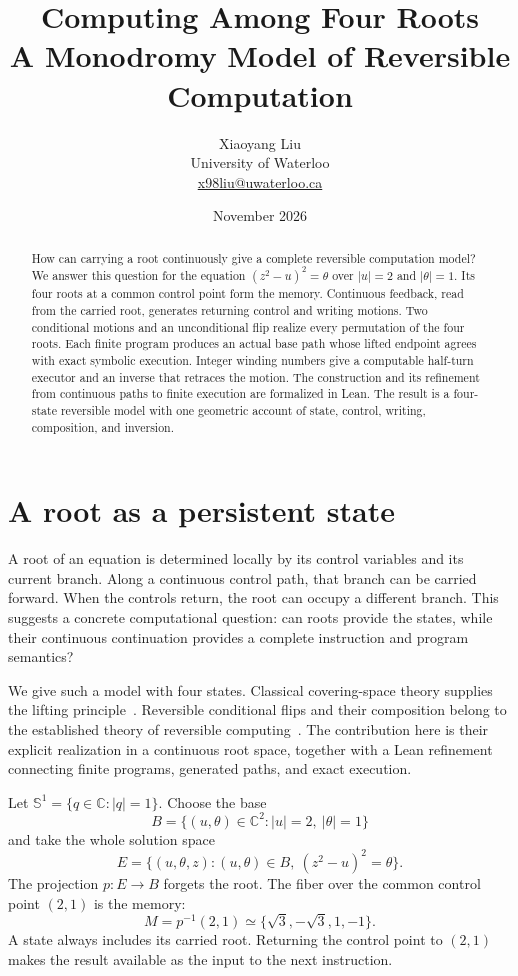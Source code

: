 \documentclass[11pt]{article}
\title{Computing Among Four Roots\\[0.3em]
  \large A Monodromy Model of Reversible Computation}
\author{Xiaoyang Liu\\[0.2em]
  \small University of Waterloo\\
  \small\href{mailto:x98liu@uwaterloo.ca}{x98liu@uwaterloo.ca}}
\date{\small November 2026}
\newcommand{\Sone}{\mathbb S^1}
\begin{document}
\maketitle
\begin{abstract}
How can carrying a root continuously give a complete reversible computation
model? We answer this question for the equation $(z^2-u)^2=\theta$ over
$|u|=2$ and $|\theta|=1$. Its four roots at a common control point form the
memory. Continuous feedback, read from the carried root, generates returning
control and writing motions. Two conditional motions and an unconditional
flip realize every permutation of the four roots. Each finite program
produces an actual base path whose lifted endpoint agrees with exact symbolic
execution. Integer winding numbers give a computable half-turn executor and
an inverse that retraces the motion. The construction and its refinement
from continuous paths to finite execution are formalized in Lean. The result
is a four-state reversible model with one geometric account of state,
control, writing, composition, and inversion.
\end{abstract}

\section{A root as a persistent state}

A root of an equation is determined locally by its control variables and its
current branch. Along a continuous control path, that branch can be carried
forward. When the controls return, the root can occupy a different branch.
This suggests a concrete computational question: can roots provide the
states, while their continuous continuation provides a complete instruction
and program semantics?

We give such a model with four states. Classical covering-space theory
supplies the lifting principle~\cite{hatcher}. Reversible conditional flips
and their composition belong to the established theory of reversible
computing~\cite{toffoli}. The contribution here is their explicit realization
in a continuous root space, together with a Lean refinement connecting
finite programs, generated paths, and exact execution.

Let $\Sone=\{q\in\mathbb C:|q|=1\}$. Choose the base
\[
 B=\{(u,\theta)\in\mathbb C^2:|u|=2,\ |\theta|=1\}
\]
and take the whole solution space
\begin{equation}\label{eq:space}
 E=\{(u,\theta,z):(u,\theta)\in B,\ (z^2-u)^2=\theta\}.
\end{equation}
The projection $p:E\to B$ forgets the root. The fiber over the common control
point $(2,1)$ is the memory:
\[
 M=p^{-1}(2,1)\simeq\{\sqrt3,-\sqrt3,1,-1\}.
\]
A state always includes its carried root. Returning the control point to
$(2,1)$ makes the result available as the input to the next instruction.
\end{document}
